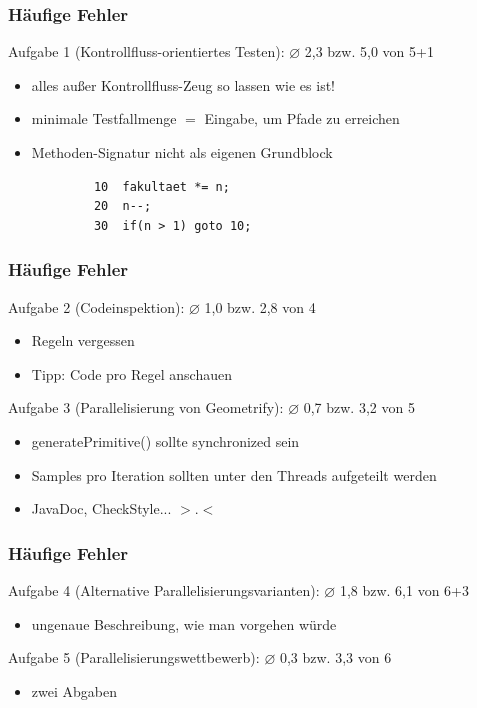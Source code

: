 \documentclass[18pt]{beamer}
\begin{document}
	\begin{frame}[fragile]
		\frametitle{Häufige Fehler}
		\begin{block}{Aufgabe 1 (Kontrollfluss-orientiertes Testen): $\diameter$ 2,3 bzw. 5,0 von 5+1}
			\begin{itemize}
				\pause 
				\item alles außer Kontrollfluss-Zeug so lassen wie es ist! \pause
				\item minimale Testfallmenge $=$ Eingabe, um Pfade zu erreichen \pause
				\item Methoden-Signatur nicht als eigenen Grundblock \pause
			\end{itemize}
		\end{block}
		\begin{verbatim}
			10	fakultaet *= n;
			20  n--;
			30  if(n > 1) goto 10;
		\end{verbatim}
\end{frame}

	\begin{frame}
		\frametitle{Häufige Fehler}
		\begin{block}{Aufgabe 2 (Codeinspektion): $\diameter$ 1,0 bzw. 2,8 von 4}
			\begin{itemize}
				\pause 
				\item Regeln vergessen \pause
				\item Tipp: Code pro Regel anschauen
			\end{itemize}
		\end{block}
		\pause 
		\begin{block}{Aufgabe 3 (Parallelisierung von Geometrify): $\diameter$  0,7 bzw. 3,2 von 5}
			\begin{itemize}
				\pause
				\item generatePrimitive() sollte synchronized sein \pause
				\item Samples pro Iteration sollten unter den Threads aufgeteilt werden \pause
				\item JavaDoc, CheckStyle... $>.<$
			\end{itemize}
		\end{block}
	\end{frame}

	\begin{frame}
		\frametitle{Häufige Fehler}
		\begin{block}{Aufgabe 4 (Alternative Parallelisierungsvarianten): $\diameter$ 1,8 bzw. 6,1 von 6+3}
			\begin{itemize}
				\pause
				\item ungenaue Beschreibung, wie man vorgehen würde
			\end{itemize}
		\end{block}
		\pause
		\begin{block}{Aufgabe 5 (Parallelisierungswettbewerb): $\diameter$ 0,3 bzw. 3,3  von 6}
			\begin{itemize}
				\item zwei Abgaben
			\end{itemize}
		\end{block}
	\end{frame}
		
\end{document}
